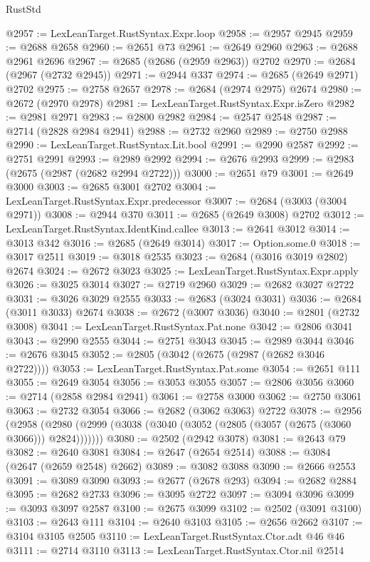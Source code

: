 \begin{lexlean}{RustStd}
\begin{coremodule}
@2957 := LexLeanTarget.RustSyntax.Expr.loop
@2958 := @2957 @2945
@2959 := @2688 @2658
@2960 := @2651 @73
@2961 := @2649 @2960
@2963 := @2688 @2961 @2696
@2967 := @2685 (@2686 (@2959 @2963)) @2702
@2970 := @2684 (@2967 (@2732 @2945))
@2971 := @2944 @337
@2974 := @2685 (@2649 @2971) @2702
@2975 := @2758 @2657
@2978 := @2684 (@2974 @2975) @2674
@2980 := @2672 (@2970 @2978)
@2981 := LexLeanTarget.RustSyntax.Expr.isZero
@2982 := @2981 @2971
@2983 := @2800 @2982
@2984 := @2547 @2548
@2987 := @2714 (@2828 @2984 @2941)
@2988 := @2732 @2960
@2989 := @2750 @2988
@2990 := LexLeanTarget.RustSyntax.Lit.bool
@2991 := @2990 @2587
@2992 := @2751 @2991
@2993 := @2989 @2992
@2994 := @2676 @2993
@2999 := @2983 (@2675 (@2987 (@2682 @2994 @2722)))
@3000 := @2651 @79
@3001 := @2649 @3000
@3003 := @2685 @3001 @2702
@3004 := LexLeanTarget.RustSyntax.Expr.predecessor
@3007 := @2684 (@3003 (@3004 @2971))
@3008 := @2944 @370
@3011 := @2685 (@2649 @3008) @2702
@3012 := LexLeanTarget.RustSyntax.IdentKind.callee
@3013 := @2641 @3012
@3014 := @3013 @342
@3016 := @2685 (@2649 @3014)
@3017 := Option.some.{0}
@3018 := @3017 @2511
@3019 := @3018 @2535
@3023 := @2684 (@3016 @3019 @2802) @2674
@3024 := @2672 @3023
@3025 := LexLeanTarget.RustSyntax.Expr.apply
@3026 := @3025 @3014
@3027 := @2719 @2960
@3029 := @2682 @3027 @2722
@3031 := @3026 @3029 @2555
@3033 := @2683 (@3024 @3031)
@3036 := @2684 (@3011 @3033) @2674
@3038 := @2672 (@3007 @3036)
@3040 := @2801 (@2732 @3008)
@3041 := LexLeanTarget.RustSyntax.Pat.none
@3042 := @2806 @3041
@3043 := @2990 @2555
@3044 := @2751 @3043
@3045 := @2989 @3044
@3046 := @2676 @3045
@3052 := @2805 (@3042 (@2675 (@2987 (@2682 @3046 @2722))))
@3053 := LexLeanTarget.RustSyntax.Pat.some
@3054 := @2651 @111
@3055 := @2649 @3054
@3056 := @3053 @3055
@3057 := @2806 @3056
@3060 := @2714 (@2858 @2984 @2941)
@3061 := @2758 @3000
@3062 := @2750 @3061
@3063 := @2732 @3054
@3066 := @2682 (@3062 @3063) @2722
@3078 := @2956
    (@2958 (@2980 (@2999 (@3038 (@3040 (@3052 (@2805 (@3057 (@2675 (@3060 @3066))) @2824)))))))
@3080 := @2502 (@2942 @3078)
@3081 := @2643 @79
@3082 := @2640 @3081
@3084 := @2647 (@2654 @2514)
@3088 := @3084 (@2647 (@2659 @2548) @2662)
@3089 := @3082 @3088
@3090 := @2666 @2553
@3091 := @3089 @3090
@3093 := @2677 (@2678 @293)
@3094 := @2682 @2884
@3095 := @2682 @2733
@3096 := @3095 @2722
@3097 := @3094 @3096
@3099 := @3093 @3097 @2587
@3100 := @2675 @3099
@3102 := @2502 (@3091 @3100)
@3103 := @2643 @111
@3104 := @2640 @3103
@3105 := @2656 @2662
@3107 := @3104 @3105 @2505
@3110 := LexLeanTarget.RustSyntax.Ctor.adt @46 @46
@3111 := @2714 @3110
@3113 := LexLeanTarget.RustSyntax.Ctor.nil @2514

\end{coremodule}
\end{lexlean}
